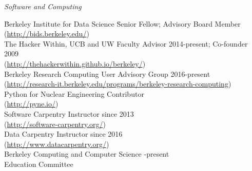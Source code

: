 \vspace*{-.5em}
\textit{Software and Computing}
\begin{tabbing}
\hspace*{2 em}\= Berkeley Institute for Data Science \hspace*{6em} \= Senior Fellow; Advisory Board Member\\ 
\>\hspace*{2 em}(\href{http://bids.berkeley.edu/}{http://bids.berkeley.edu/}) \\
%
\> The Hacker Within, UCB and UW \> Faculty Advisor 2014-present; Co-founder 2009\\
\> \hspace*{2 em}(\href{http://thehackerwithin.github.io/berkeley/}{http://thehackerwithin.github.io/berkeley/})\\
%
\> Berkeley Research Computing  \> User Advisory Group 2016-present \\
\> \hspace*{2 em}(\href{http://research-it.berkeley.edu/programs/berkeley-research-computing}{http://research-it.berkeley.edu/programs/berkeley-research-computing})\\
%
\> Python for Nuclear Engineering  \> Contributor \\
\> \hspace*{2 em}(\href{http://pyne.io/}{http://pyne.io/})\\
%
\> Software Carpentry  \> Instructor since 2013\\
\> \hspace*{2 em}(\href{http://software-carpentry.org/}{http://software-carpentry.org/})\\
%
\> Data Carpentry  \> Instructor since 2016\\
\> \hspace*{2 em}(\href{http://www.datacarpentry.org/}{http://www.datacarpentry.org/})\\
%
\> Berkeley Computing and Computer Science -present \\
\> \hspace*{2 em}Education Committee%
\end{tabbing}

